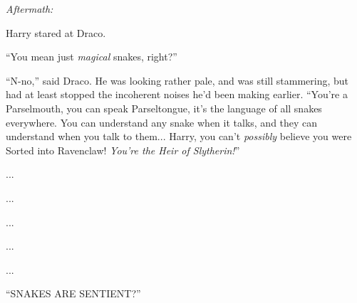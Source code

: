 \emph{Aftermath:}

Harry stared at Draco.

``You mean just \emph{magical} snakes, right?''

``N-no,'' said Draco. He was looking rather pale, and was still stammering, but had at least stopped the incoherent noises he'd been making earlier. ``You're a Parselmouth, you can speak Parseltongue, it's the language of all snakes everywhere. You can understand any snake when it talks, and they can understand when you talk to them... Harry, you can't \emph{possibly} believe you were Sorted into Ravenclaw! \emph{You're the Heir of Slytherin!}''

...

...

...

...

...

``SNAKES ARE SENTIENT?''
